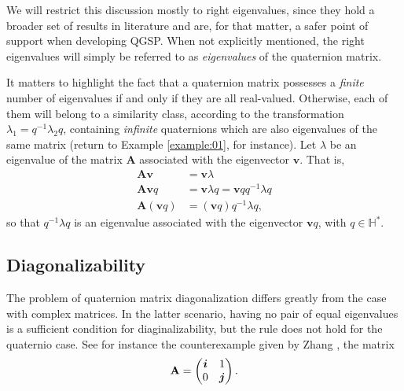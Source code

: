 We will restrict this discussion mostly to right eigenvalues, since they hold a broader set of results in literature \cite[Cap. 5]{zhang1997quaternions} and are, for that matter, a safer point of support when developing QGSP. When not explicitly mentioned, the right eigenvalues will simply be referred to as \textit{eigenvalues} of the quaternion matrix.

It matters to highlight the fact that a quaternion matrix possesses a \textit{finite} number of eigenvalues if and only if they are all real-valued. Otherwise, each of them will belong to a similarity class, according to the transformation $ \lambda_1 = q^{-1} \lambda_2 q $, containing \textit{infinite} quaternions which are also eigenvalues of the same matrix (return to Example \ref{example:01}, for instance). Let $ \lambda $ be an eigenvalue of the matrix $ \mathbf{A} $ associated with the eigenvector $ \mathbf{v} $. That is,
\begin{equation}
    \begin{aligned}
        \label{eq:similar}
        \mathbf{A} \mathbf{v}     & = \mathbf{v} \lambda                                   \\
        \mathbf{A} \mathbf{v} q   & = \mathbf{v} \lambda q = \mathbf{v} q q^{-1} \lambda q \\
        \mathbf{A} (\mathbf{v} q) & = (\mathbf{v} q) q^{-1} \lambda q,
    \end{aligned}
\end{equation}
so that $ q^{-1} \lambda q $ is an eigenvalue associated with the eigenvector $ \mathbf{v}q $, with $ q \in \mathbb{H}^\ast $.

\subsection{Diagonalizability}
\label{subsec:autovetores_XA}

The problem of quaternion matrix diagonalization differs greatly from the case with complex matrices. In the latter scenario, having no pair of equal eigenvalues is a sufficient condition for diaginalizability, but the rule does not hold for the quaternio case. See for instance the counterexample given by Zhang \cite[Exemplo 7.4]{zhang1997quaternions}, the matrix
\begin{equation}
    \mathbf{A} =
    \begin{pmatrix}
        \boldsymbol{i} & 1   \\
        0   & \boldsymbol{j}
    \end{pmatrix}.
\end{equation}

